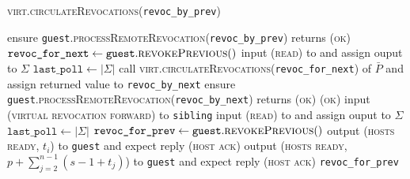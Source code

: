 \begin{center}
  \begin{processbox}{\textsc{virt.circulateRevocations}(\texttt{revoc\_by\_prev})}
    \begin{algorithmic}[1]
     
      \State ensure
      \texttt{guest}.\textsc{processRemoteRevocation}(\texttt{revoc\_by\_prev})
      returns (\textsc{ok})
      \label{code:virtual-layer:revocation:non-funder:proc-remote}
    \Else \: 
      \State $\texttt{revoc\_for\_next} \gets
      \texttt{guest}.\textsc{revokePrevious}()$
      \State input (\textsc{read}) to \ledger and assign ouput to $\Sigma$
      \State $\texttt{last\_poll} \gets |\Sigma|$
      \State call
      \textsc{virt.circulateRevocations}(\texttt{revoc\_for\_next}) of
      $\bar{P}$ and assign returned value to \texttt{revoc\_by\_next}
      \label{code:virtual-layer:revocation:revoc-by-next}
      \State ensure
      \texttt{guest}.\textsc{processRemoteRevocation}(\texttt{revoc\_by\_next})
      returns (\textsc{ok}) 
      \label{code:virtual-layer:revocation:funder:proc-remote}
      \State \Return (\textsc{ok})
    \EndIf
     
      \State input (\textsc{virtual revocation forward}) to \texttt{sibling}
      \State {}
      \State input (\textsc{read}) to \ledger and assign ouput to $\Sigma$
      \State $\texttt{last\_poll} \gets |\Sigma|$
      \State {}
      \State {}
      \State {}
      \State {}
    \EndIf
    \State $\texttt{revoc\_for\_prev} \gets
    \texttt{guest}.\textsc{revokePrevious}()$
     
      \State output (\textsc{hosts ready}, $t_i$) to \texttt{guest} and expect
      reply (\textsc{host ack})
      \label{code:virtual-layer:revocation:hosts-ready}
    \Else \: 
      \State output (\textsc{hosts ready}, $p + \sum\limits_{j = 2}^{n-1}(s -
      1 + t_j)$) to \texttt{guest} and expect reply (\textsc{host ack})
    \EndIf
    \State \Return \texttt{revoc\_for\_prev}
    \end{algorithmic}
  \end{processbox}
  \label{code:virtual-layer:revocation}
\end{center} \ \\

